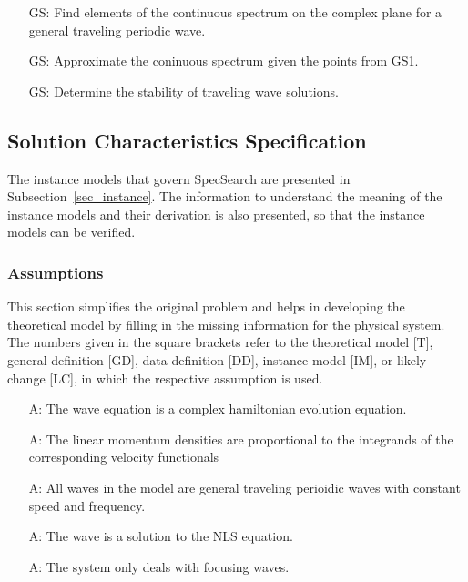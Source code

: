 \documentclass[12pt]{article}
\newcounter{assumpnum} %
\newcounter{goalnum} %
\begin{document}
\begin{itemize}

\item[GS\refstepcounter{goalnum}\thegoalnum \label{G_meaningfulLabel}:] 
Find elements of the continuous spectrum on the complex plane for a general 
traveling periodic wave. 
\item[GS\refstepcounter{goalnum}\thegoalnum \label{G_meaningfulLabel}:] 
Approximate the coninuous spectrum given the points from GS1.
\item[GS\refstepcounter{goalnum}\thegoalnum \label{G_meaningfulLabel}:] 
Determine the stability of traveling wave solutions.

\end{itemize}

\subsection{Solution Characteristics Specification}

The instance models that govern SpecSearch are presented in
Subsection~\ref{sec_instance}.  The information to understand the meaning of the
instance models and their derivation is also presented, so that the instance
models can be verified.

\subsubsection{Assumptions}

This section simplifies the original problem and helps in developing the
theoretical model by filling in the missing information for the physical
system. The numbers given in the square brackets refer to the theoretical model
[T], general definition [GD], data definition [DD], instance model [IM], or
likely change [LC], in which the respective assumption is used.

\begin{itemize}

\item[A\refstepcounter{assumpnum}\theassumpnum \label{A_meaningfulLabel}:]The 
wave equation is a complex hamiltonian evolution equation. 
\item[A\refstepcounter{assumpnum}\theassumpnum \label{A_meaningfulLabel}:]The 
linear momentum densities are proportional to the integrands of the 
corresponding velocity functionals 
\item[A\refstepcounter{assumpnum}\theassumpnum \label{A_meaningfulLabel}:]All 
waves in the model are general traveling perioidic waves with constant speed 
and frequency. 
\item[A\refstepcounter{assumpnum}\theassumpnum \label{A_meaningfulLabel}:]The 
wave is a solution to the NLS equation.
\item[A\refstepcounter{assumpnum}\theassumpnum \label{A_meaningfulLabel}:]The 
system only deals with focusing waves.

\end{itemize}
\end{document}
